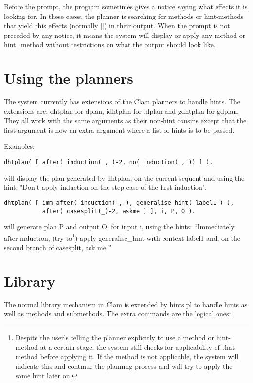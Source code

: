         Before the prompt, the program sometimes gives a notice saying
what effects it is looking for. In these cases, the planner is
searching for methods or hint-methods that yield this effects (normally
[]) in their output. When the prompt is not preceded by any notice, it
means the system will display or apply any method or hint\_method
without  restrictions on what the output should look like.


\section{Using the planners}

        The system currently has extensions of the Clam planners to
handle hints. The extensions are: dhtplan for dplan, idhtplan for idplan
and gdhtplan for gdplan. They all work with the same arguments as their
non-hint cousins except that the first argument is now an extra argument
where a list of hints is to be passed.

        Examples:

\begin{verbatim} 
dhtplan( [ after( induction(_,_)-2, no( induction(_,_)) ] ). 
\end{verbatim}will display the plan generated by dhtplan, on the
current sequent and using the hint:  "Don't apply induction on the step
case of the first induction".

\begin{verbatim}
dhtplan( [ imm_after( induction(_,_), generalise_hint( label1 ) ),
           after( casesplit(_)-2, askme ) ], i, P, O ). \end{verbatim}
will generate plan P and output O, for input i, using the hints:
``Immediately after induction, (try to\footnote{Despite the user's
telling the planner explicitly to use a method or hint-method at a
certain stage, the system still checks for applicability of that method
before applying it. If the method is not applicable, the system will
indicate this and continue the planning process and will try to apply
the same hint later on.}) apply  generalise\_hint with context label1
and, on the second branch of casesplit, ask me ''

\section{Library}

        The normal library mechanism in Clam is extended by hints.pl to
handle hints as well as methods and submethods. The extra commands are
the logical ones:

